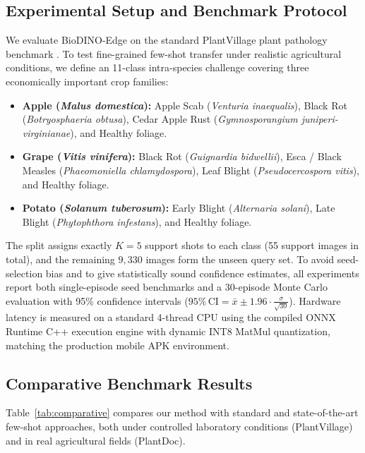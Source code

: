 \documentclass[conference]{IEEEtran}
\begin{document}
\subsection{Experimental Setup and Benchmark Protocol}
We evaluate BioDINO-Edge on the standard PlantVillage plant pathology benchmark \cite{hughes2012plantvillage}. To test fine-grained few-shot transfer under realistic agricultural conditions, we define an 11-class intra-species challenge covering three economically important crop families:
\begin{itemize}
    \item \textbf{Apple (\textit{Malus domestica}):} Apple Scab (\textit{Venturia inaequalis}), Black Rot (\textit{Botryosphaeria obtusa}), Cedar Apple Rust (\textit{Gymnosporangium juniperi-virginianae}), and Healthy foliage.
    \item \textbf{Grape (\textit{Vitis vinifera}):} Black Rot (\textit{Guignardia bidwellii}), Esca / Black Measles (\textit{Phaeomoniella chlamydospora}), Leaf Blight (\textit{Pseudocercospora vitis}), and Healthy foliage.
    \item \textbf{Potato (\textit{Solanum tuberosum}):} Early Blight (\textit{Alternaria solani}), Late Blight (\textit{Phytophthora infestans}), and Healthy foliage.
\end{itemize}
The split assigns exactly $K=5$ support shots to each class (55 support images in total), and the remaining $9,330$ images form the unseen query set. To avoid seed-selection bias and to give statistically sound confidence estimates, all experiments report both single-episode seed benchmarks and a 30-episode Monte Carlo evaluation with 95\% confidence intervals ($95\%\,\text{CI} = \bar{x} \pm 1.96 \cdot \frac{\sigma}{\sqrt{30}}$). Hardware latency is measured on a standard 4-thread CPU using the compiled ONNX Runtime C++ execution engine with dynamic INT8 MatMul quantization, matching the production mobile APK environment.

\subsection{Comparative Benchmark Results}
Table~\ref{tab:comparative} compares our method with standard and state-of-the-art few-shot approaches, both under controlled laboratory conditions (PlantVillage) and in real agricultural fields (PlantDoc).
\end{document}
